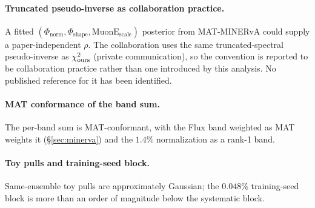 \paragraph{Truncated pseudo-inverse as collaboration practice.} A fitted $(\Phi_{\text{norm}},\Phi_{\text{shape}},\text{MuonE}_{\text{scale}})$ posterior from MAT-MINERvA could supply a paper-independent $\rho$. The collaboration uses the same truncated-spectral pseudo-inverse as $\chi^{2}_{\text{ours}}$ (private communication), so the convention is reported to be collaboration practice rather than one introduced by this analysis. No published reference for it has been identified.

\paragraph{MAT conformance of the band sum.} The per-band sum is MAT-conformant, with the Flux band weighted as MAT weights it (\S\ref{sec:minerva}) and the $1.4\%$ normalization as a rank-1 band.

\paragraph{Toy pulls and training-seed block.} Same-ensemble toy pulls are approximately Gaussian; the $0.048\%$ training-seed block is more than an order of magnitude below the systematic block.

